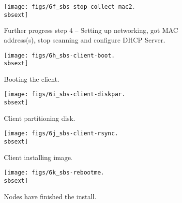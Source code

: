 \begin{figure}[htbp]
  \begin{center}
    \texttt{[image: figs/6f\_sbs-stop-collect-mac2.\\sbsext]}
   \caption{Further progress step 4 -- Setting up networking, got MAC address(s), stop scanning and configure DHCP Server.}
    \label{fig:sbs-setup-network3}
  \end{center}
\end{figure}


\setlength{\oddsidemargin}{-0.5in}
\setlength{\evensidemargin}{-0.5in}
\setlength{\textwidth}{7.5in}

\begin{figure}[htbp]
  \begin{center}
    \texttt{[image: figs/6h\_sbs-client-boot.\\sbsext]}
    \caption{Booting the client.}
    \label{fig:sbs-install-boot}
  \end{center}
\end{figure}

\begin{figure}[htbp]
  \begin{center}
    \texttt{[image: figs/6i\_sbs-client-diskpar.\\sbsext]}
    \caption{Client partitioning disk.}
    \label{fig:sbs-install-diskpar}
  \end{center}
\end{figure}
  

\begin{figure}[htbp]
  \begin{center}
    \texttt{[image: figs/6j\_sbs-client-rsync.\\sbsext]}
    \caption{Client installing image.}
    \label{fig:sbs-install-rsync}
  \end{center}
\end{figure}

\begin{figure}[htbp]
  \begin{center}
    \texttt{[image: figs/6k\_sbs-rebootme.\\sbsext]}
    \caption{Nodes have finished the install.}
    \label{fig:sbs-install-finish}
  \end{center}
\end{figure}

